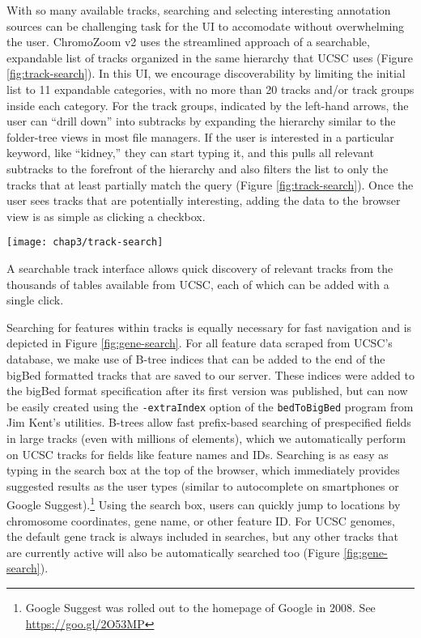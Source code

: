 With so many available tracks, searching and selecting interesting annotation sources can be challenging task for the UI to accomodate without overwhelming the user. ChromoZoom v2 uses the streamlined approach of a searchable, expandable list of tracks organized in the same hierarchy that UCSC uses (Figure \ref{fig:track-search}). In this UI, we encourage discoverability by limiting the initial list to 11 expandable categories, with no more than 20 tracks and/or track groups inside each category. For the track groups, indicated by the left-hand arrows, the user can ``drill down'' into subtracks by expanding the hierarchy similar to the folder-tree views in most file managers. If the user is interested in a particular keyword, like ``kidney,'' they can start typing it, and this pulls all relevant subtracks to the forefront of the hierarchy and also filters the list to only the tracks that at least partially match the query (Figure \ref{fig:track-search}). Once the user sees tracks that are potentially interesting, adding the data to the browser view is as simple as clicking a checkbox.

\begin{marginfigure}
  \texttt{[image: chap3/track-search]}               
  \caption[Track searching interface for UCSC reference genomes.]{A searchable track interface allows quick discovery of relevant tracks from the thousands of tables available from UCSC, each of which can be added with a single click.}
  \label{fig:track-search}
\end{marginfigure}

Searching for features within tracks is equally necessary for fast navigation and is depicted in Figure \ref{fig:gene-search}. For all feature data scraped from UCSC's database, we make use of B-tree indices that can be added to the end of the bigBed formatted tracks that are saved to our server. These indices were added to the bigBed format specification after its first version was published,\autocite{Kent2010} but can now be easily created using the \texttt{-extraIndex} option of the \texttt{bedToBigBed} program from Jim Kent's utilities. B-trees allow fast prefix-based searching of prespecified fields in large tracks (even with millions of elements), which we automatically perform on UCSC tracks for fields like feature names and IDs. Searching is as easy as typing in the search box at the top of the browser, which immediately provides suggested results as the user types (similar to autocomplete on smartphones or Google Suggest).\footnote{Google Suggest was rolled out to the homepage of Google in 2008. See \url{https://goo.gl/2O53MP}} Using the search box, users can quickly jump to locations by chromosome coordinates, gene name, or other feature ID. For UCSC genomes, the default gene track is always included in searches, but any other tracks that are currently active will also be automatically searched too (Figure \ref{fig:gene-search}).


